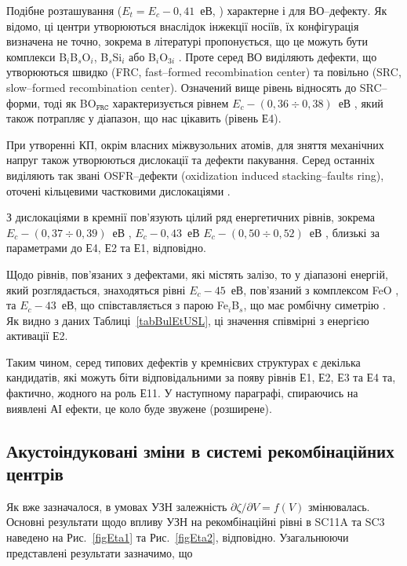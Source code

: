 Подібне розташування ($E_t=E_c-0,41$~еВ, \cite{LIDRev,LIDRev2,BO3i,Rein,LID:SchmidtJMR}) характерне і для ВО--дефекту.
Як відомо, ці центри утворюються внаслідок інжекції носіїв,
їх конфігурація визначена не точно, зокрема в літературі пропонується,
що це можуть бути комплекси B$_i$B$_s$O$_i$, B$_s$Si$_i$\cite{LIDRev} або
B$_i$O$_{3i}$ \cite{BO3i}.
Проте серед ВО виділяють дефекти,
що утворюються швидко (FRC, fast--formed recombination center)
та повільно (SRC, slow--formed recombination center).
Означений вище рівень відносять до SRC--форми,
тоді як  BO$_\mathtt{FRC}$ характеризується рівнем $E_c-(0,36\div0,38)$~еВ \cite{LIDRev2,BOSingle:SEMSS2017}, який
також потрапляє у діапазон, що нас цікавить (рівень Е4).

При утворенні КП, окрім власних міжвузольних атомів, для зняття механічних напруг також утворюються дислокації та дефекти пакування.
Серед останніх виділяють так звані OSFR--дефекти (oxidization induced stacking--faults ring), оточені кільцевими частковими дислокаціями \cite{MSER74,MSER28}.

З дислокаціями в кремнії пов'язують цілий ряд енергетичних рівнів, зокрема
$E_c-(0,37\div0,39)$~еВ \cite{PhysRevB56:10208,kveder2008,SiO:Hwang,disl10:Isakova,Kittler2003},
$E_c-0,43$~еВ \cite{PhysRevB56:10208,SiO:Vanhell}
$E_c-(0,50\div0,52)$~еВ \cite{Edis:Ogawa,Edis:Omling,Kittler2003},
близькі за параметрами до Е4, Е2 та Е1, відповідно.

Щодо рівнів, пов'язаних з дефектами, які містять залізо, то у діапазоні енергій, який розглядається,
знаходяться рівні $E_c-45$~еВ, пов'язаний з комплексом FeO \cite{FeO},
та $E_c-43$~еВ, що співставляється з парою Fe$_i$B$_s$, що має ромбічну симетрію \cite{FeB:PhysRevB49,Istratov1999}.
Як видно з даних Таблиці~\ref{tabBulEtUSL}, ці значення співмірні з енергією активації Е2.

Таким чином, серед типових дефектів у кремнієвих структурах є декілька кандидатів,
які можуть біти відповідальними за появу рівнів Е1, Е2, Е3 та Е4 та, фактично, жодного на роль Е11.
У наступному параграфі, спираючись на виявлені АІ ефекти, це коло буде звужене (розширене).

\subsection{Акустоіндуковані зміни в системі рекомбінаційних центрів\label{sbBul3}}

Як вже зазначалося, в умовах УЗН залежність $\partial \zeta/ \partial V = f (V)$ змінювалась.
Основні результати щодо впливу УЗН на рекомбінаційні рівні в SC11A та SC3 наведено
на Рис.~\ref{figEta1} та Рис.~\ref{figEta2}, відповідно.
Узагальнюючи представлені результати зазначимо, що


